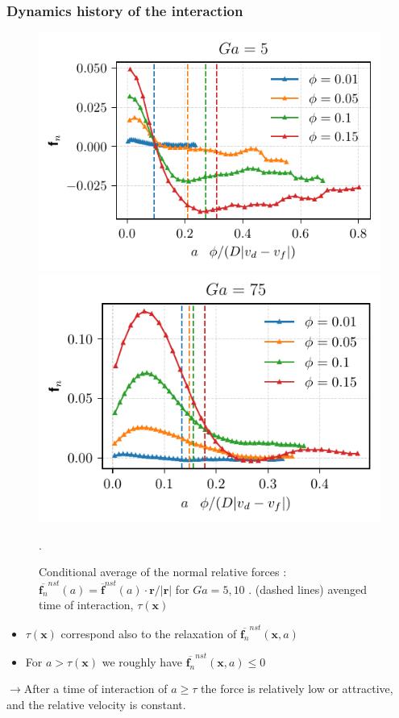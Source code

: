 \documentclass{sintefbeamer}
\newcommand{\nstavg}[1]{\overline{#1}^{nst}}
\begin{document}
\begin{frame}
  \frametitle{Dynamics history of the interaction}
    \begin{figure}
      \includegraphics[height=0.24\textwidth]{image/HOMOGENEOUS/fDrop/f_a_Ga_5.pdf}
      \includegraphics[height=0.24\textwidth]{image/HOMOGENEOUS/fDrop/f_a_Ga_75.pdf}
        \caption{Conditional average of the normal relative forces : $\nstavg{\textbf{f}_n}(a) = \nstavg{\textbf{f}}(a)\cdot \textbf{r}/|\textbf{r}|$ for $Ga = 5,10$ . 
        (dashed lines) avenged time of interaction, $\tau(\textbf{x})$}. 
    \end{figure}

\begin{itemize}
  \item $\tau(\textbf{x})$ correspond also to the relaxation of $\nstavg{\textbf{f}_n}(\textbf{x},a)$
  \item For $a > \tau(\textbf{x})$ we roughly have $\nstavg{\textbf{f}_n}(\textbf{x},a) \leq 0 $
\end{itemize}
$\rightarrow$After a time of interaction of $a \geq \tau$ the force is relatively low or attractive,  and the relative velocity is constant. 
\end{frame}
\end{document}
